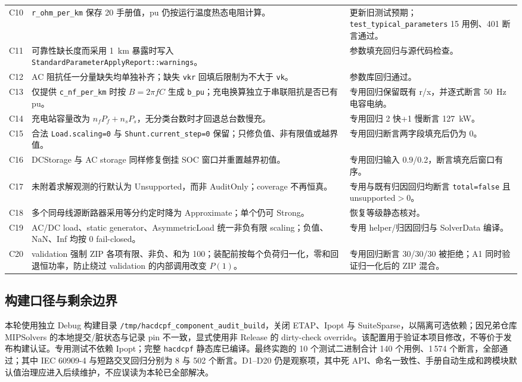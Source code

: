\documentclass[11pt,a4paper,fontset=fandol]{ctexart}
\newcommand{\file}[1]{\texttt{#1}}
\begin{document}
\begin{footnotesize}
\begin{longtable}{@{}p{0.7cm}p{8.4cm}p{6.0cm}@{}}
C10 & \file{r\_ohm\_per\_km} 保存 20\textcelsius{} 手册值，pu 仍按运行温度热态电阻计算。 & 更新旧测试预期；\file{test\_typical\_parameters} 15 用例、401 断言通过。\\
C11 & 可靠性缺长度而采用 1~km 暴露时写入 \file{StandardParameterApplyReport::warnings}。 & 参数填充回归与源代码检查。\\
C12 & AC 阻抗任一分量缺失均单独补齐；缺失 \file{vkr} 回填后限制为不大于 \file{vk}。 & 参数库回归通过。\\
C13 & 仅提供 \file{c\_nf\_per\_km} 时按 $B=2\pi fC$ 生成 \file{b\_pu}；充电换算独立于串联阻抗是否已有 pu。 & 专用回归保留既有 r/x，并逐式断言 50~Hz 电容电纳。\\
C14 & 充电站容量改为 $n_fP_f+n_sP_s$，无分类台数时才回退总台数慢充。 & 专用回归 2 快+1 慢断言 127~kW。\\
C15 & 合法 \file{Load.scaling=0} 与 \file{Shunt.current\_step=0} 保留；只修负值、非有限值或越界值。 & 专用回归断言两字段填充后仍为 0。\\
C16 & DCStorage 与 AC storage 同样修复倒挂 SOC 窗口并重置越界初值。 & 专用回归输入 0.9/0.2，断言填充后窗口有序。\\
C17 & 未附着求解观测的行默认为 Unsupported，而非 AuditOnly；coverage 不再恒真。 & 专用与既有归因回归均断言 \file{total=false} 且 unsupported$>0$。\\
C18 & 多个同母线源断路器采用等分约定时降为 Approximate；单个仍可 Strong。 & 恢复等级静态核对。\\
C19 & AC/DC load、static generator、AsymmetricLoad 统一非负有限 scaling；负值、NaN、Inf 均按 0 fail-closed。 & 专用 helper/归因回归与 SolverData 编译。\\
C20 & validation 强制 ZIP 各项有限、非负、和为 100；装配前按每个负荷归一化，零和回退恒功率，防止绕过 validation 的内部调用改变 $P(1)$。 & 专用回归断言 30/30/30 被拒绝；A1 同时验证归一化后的 ZIP 混合。\\
\bottomrule
\end{longtable}
\end{footnotesize}

\subsection{构建口径与剩余边界}

本轮使用独立 Debug 构建目录 \file{/tmp/hacdcpf\_component\_audit\_build}，关闭 ETAP、Ipopt 与 SuiteSparse，以隔离可选依赖；因兄弟仓库 MIPSolvers 的本地提交/脏状态与记录 pin 不一致，显式使用非 Release 的 dirty-check override。该配置用于验证本项目修改，不等价于发布构建认证。专用测试不依赖 Ipopt；完整 \file{hacdcpf} 静态库已编译。最终实跑的 10 个测试二进制合计 140 个用例、1\,574 个断言，全部通过；其中 IEC 60909-4 与短路交叉回归分别为 8 与 502 个断言。D1--D20 仍是观察项，其中死 API、命名一致性、手册自动生成和跨模块默认值治理应进入后续维护，不应误读为本轮已全部解决。
\end{document}

